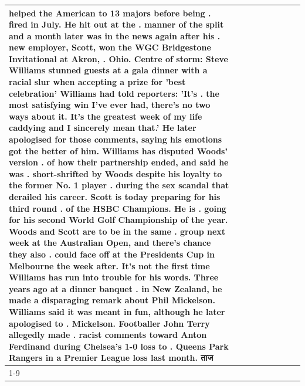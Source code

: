 \begin{table}[H]
\begin{tabular}{lllrlllll}
helped the American to 13 majors before being . fired in July. He hit out at the . manner of the split and a month later was in the news again after his . new employer, Scott, won the WGC Bridgestone Invitational at Akron, . Ohio. Centre of storm: Steve Williams stunned guests at a gala dinner with a racial slur when accepting a prize for 'best celebration' Williams had told reporters: 'It's . the most satisfying win I've ever had, there's no two ways about it. It's the greatest week of my life caddying and I sincerely mean that.' He later apologised for those comments, saying his emotions got the better of him. Williams has disputed Woods' version . of how their partnership ended, and said he was . short-shrifted by Woods despite his loyalty to the former No. 1 player . during the sex scandal that derailed his career. Scott is today preparing for his third round . of the HSBC Champions. He is . going for his second World Golf Championship of the year. Woods and Scott are to be in the same . group next week at the Australian Open, and there's chance they also . could face off at the Presidents Cup in Melbourne the week after. It's not the first time Williams has run into trouble for his words. Three years ago at a dinner banquet . in New Zealand, he made a disparaging remark about Phil Mickelson. Williams said it was meant in fun, although he later apologised to . Mickelson. Footballer John Terry allegedly made . racist comments toward Anton Ferdinand during Chelsea's 1-0 loss to . Queens Park Rangers in a Premier League loss last month. ताज \\
\cline{1-9}

\end{tabular}
\end{table}

